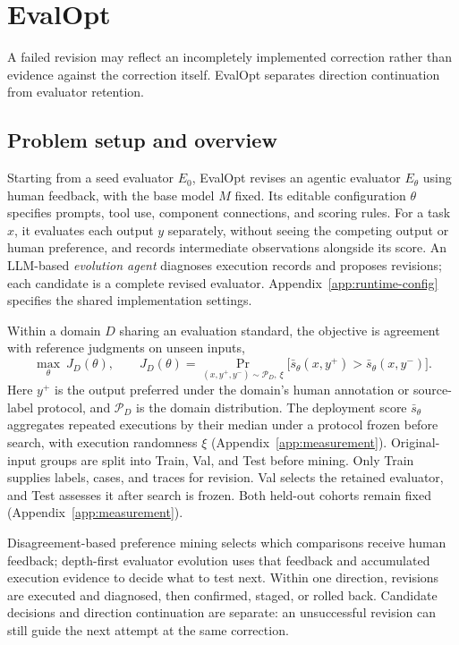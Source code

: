 \section{EvalOpt}
\label{sec:method}

A failed revision may reflect an incompletely implemented correction rather than evidence against the correction itself.
EvalOpt separates direction continuation from evaluator retention.

\subsection{Problem setup and overview}
\label{sec:problem}
\label{sec:measurement}
\label{sec:runtime}

Starting from a seed evaluator $E_0$, EvalOpt revises an agentic evaluator $E_\theta$ using human feedback, with the base model $M$ fixed.
Its editable configuration $\theta$ specifies prompts, tool use, component connections, and scoring rules.
For a task $x$, it evaluates each output $y$ separately, without seeing the competing output or human preference, and records intermediate observations alongside its score.
An LLM-based \emph{evolution agent} diagnoses execution records and proposes revisions; each candidate is a complete revised evaluator.
Appendix~\ref{app:runtime-config} specifies the shared implementation settings.

Within a domain $D$ sharing an evaluation standard, the objective is agreement with reference judgments on unseen inputs,
\begin{equation}
 \max_{\theta}\ J_D(\theta),\qquad
 J_D(\theta)=
 \Pr_{(x,y^+,y^-)\sim\mathcal P_D,\,\xi}
 \bigl[\bar s_\theta(x,y^+)>\bar s_\theta(x,y^-)\bigr].
 \label{eq:objective}
\end{equation}
Here $y^+$ is the output preferred under the domain's human annotation or source-label protocol, and $\mathcal P_D$ is the domain distribution.
The deployment score $\bar s_\theta$ aggregates repeated executions by their median under a protocol frozen before search, with execution randomness $\xi$ (Appendix~\ref{app:measurement}).
Original-input groups are split into Train, Val, and Test before mining.
Only Train supplies labels, cases, and traces for revision.
Val selects the retained evaluator, and Test assesses it after search is frozen.
Both held-out cohorts remain fixed (Appendix~\ref{app:measurement}).

Disagreement-based preference mining selects which comparisons receive human feedback; depth-first evaluator evolution uses that feedback and accumulated execution evidence to decide what to test next.
Within one direction, revisions are executed and diagnosed, then confirmed, staged, or rolled back.
Candidate decisions and direction continuation are separate: an unsuccessful revision can still guide the next attempt at the same correction.

